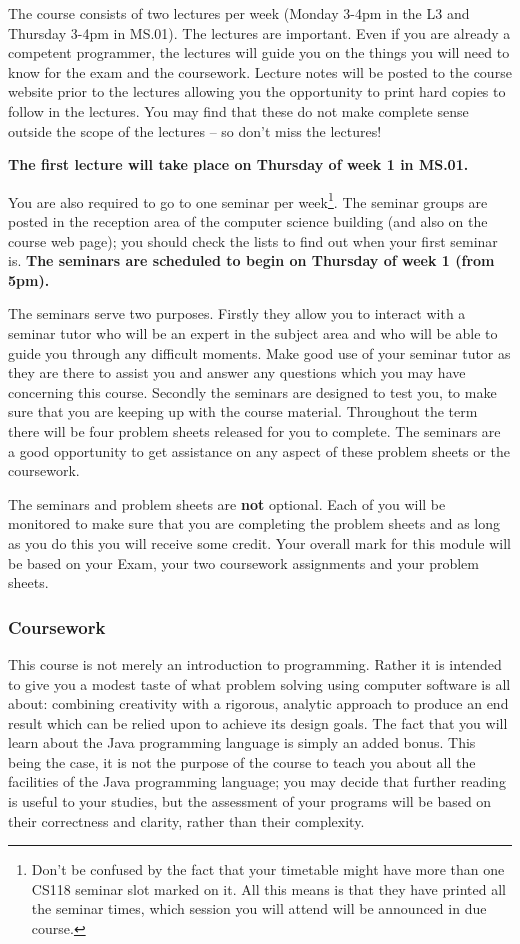 The course consists of two lectures per week (Monday 3-4pm in the L3 and 
Thursday 3-4pm in MS.01). The lectures are important. 
Even if you are already a competent programmer, the lectures will guide 
you on the things you will need to know for the exam and the coursework.
Lecture notes will be posted to the course website prior to the lectures allowing
you the opportunity to print hard copies to follow in the lectures. You may find that these do not 
make complete sense outside the scope of the lectures -- so don't miss the 
lectures!
 
{\bf The first lecture will take place on Thursday of week 1 in MS.01. }
 
You are also required to go to one seminar per week\footnote{Don't be 
confused by the fact that your timetable might have more than one CS118 
seminar slot marked on it. All this means is that they have printed all the 
seminar times, which session you will attend will be announced in due course.}. 
The seminar groups are posted in the reception area of the computer science 
building (and also on the course web page); you 
should check the lists to find out when your first seminar is. 
{\bf The seminars are scheduled to begin on Thursday of week 1 (from 5pm).}
 
The seminars serve two purposes. Firstly they allow you to interact with a
seminar tutor who will be an expert in the subject area and who will be able to 
guide you through any difficult moments. Make good use of your seminar tutor
as they are there to assist you and answer any questions which you may have 
concerning this course. Secondly the seminars are designed to test you, to 
make sure that you are keeping up with the course material. Throughout the term there 
will be four problem sheets released for you to complete. The seminars are a good opportunity
to get assistance on any aspect of these problem sheets or the coursework.
 
The seminars and problem sheets are {\bf not} optional. Each of you will be 
monitored to make sure that you are completing the problem sheets and as 
long as you do this you will receive some credit. Your overall mark for this module
will be based on your Exam, your two coursework assignments and your problem sheets.

\subsubsection{Coursework}

This course is not merely an introduction to programming. Rather it is 
intended to give you a modest taste of what problem solving using computer 
software is all about: combining creativity with a rigorous, analytic 
approach to produce an end result which can be relied upon to achieve its 
design goals. The fact that you will learn about the Java programming 
language is simply an added bonus. This being the case, it is not the 
purpose of the course to teach you about all the facilities of 
the Java programming language; you may decide that further reading is 
useful to your studies, but the assessment of your programs will be based on
their correctness and clarity, rather than their complexity.  
 
